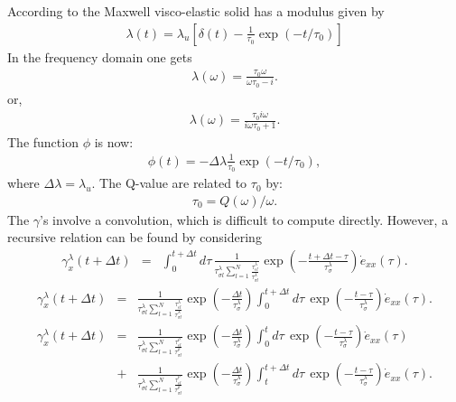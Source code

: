 \documentclass[11pt]{article}
\begin{document}
According to \cite{Casula1992} the Maxwell  visco-elastic solid
has a modulus given by
\begin{eqnarray}
\lambda(t) = \lambda_u \left[\delta(t) -\frac{1}{\tau_0}\exp(-t/\tau_0)\right]
\end{eqnarray}
In the frequency domain one gets
\begin{eqnarray}
\lambda(\omega) = \frac{\tau_0 \omega}{\omega\tau_0 -i}. 
\end{eqnarray}
or,
\begin{eqnarray}
\lambda(\omega) = \frac{\tau_0 i\omega}{i\omega\tau_0 +1}. 
\end{eqnarray}
The function $\phi$ is now:
\begin{eqnarray}
\phi(t) = -\Delta\lambda\frac{1}{\tau_0}\exp(-t/\tau_0),
\end{eqnarray}
where $\Delta\lambda = \lambda_u.$
The Q-value are related to $\tau_0$ by:
\begin{eqnarray}
  \tau_0 = Q(\omega)/\omega. 
\end{eqnarray}
The $\gamma$'s involve a convolution, which is difficult to compute directly.
However, a recursive relation can be found by considering
\begin{eqnarray*}
\gamma^{\lambda}_x(t+\Delta t) & = &
  \int^{t+\Delta t}_0 d\tau\,
  \frac{1}{\tau^{\lambda}_{\sigma l}
   {\sum_{l=1}^N \frac{\tau^{\lambda}_{\epsilon l}}
   {\tau^{\lambda}_{\sigma l}}} }
  \exp(-\frac{t+\Delta t -\tau}{\tau^{\lambda}_{\sigma}})
  \dot{e}_{xx}(\tau).
\end{eqnarray*}
\begin{eqnarray*}
\gamma^{\lambda}_x(t+\Delta t) & = &
  \frac{1}{\tau^{\lambda}_{\sigma l}{\sum_{l=1}^N \frac{\tau^{\lambda}_{\epsilon l}}{\tau^{\lambda}_{\sigma l}}} }
  \exp(-\frac{\Delta t}{\tau^{\lambda}_{\sigma}})
  \int^{t+\Delta t}_{0} d\tau\,
  \exp(-\frac{t-\tau}{\tau^{\lambda}_{\sigma}})
  \dot{e}_{xx}(\tau).
\end{eqnarray*}
\begin{eqnarray*}
\gamma^{\lambda}_x(t+\Delta t) 
 & = & 
  \frac{1}{\tau^{\lambda}_{\sigma l}\sum_{l=1}^N \frac{\tau^{\rho}_{\epsilon l}}{\tau^{\rho}_{\sigma l}}}
  \exp(-\frac{\Delta t}{\tau^{\lambda}_{\sigma}})
  \int^{t}_0 d\tau\,
  \exp(-\frac{t-\tau}{\tau^{\lambda}_{\sigma}})
  \dot{e}_{xx}(\tau)\\
 & + &
  \frac{1}{\tau^{\lambda}_{\sigma l}\sum_{l=1}^N \frac{\tau^{\rho}_{\epsilon l}}{\tau^{\rho}_{\sigma l}}}
  \exp(-\frac{\Delta t}{\tau^{\lambda}_{\sigma}})
  \int^{t+\Delta t}_t d\tau\,
  \exp(-\frac{t-\tau}{\tau^{\lambda}_{\sigma}})
  \dot{e}_{xx}(\tau).
\end{eqnarray*}
\end{document}
